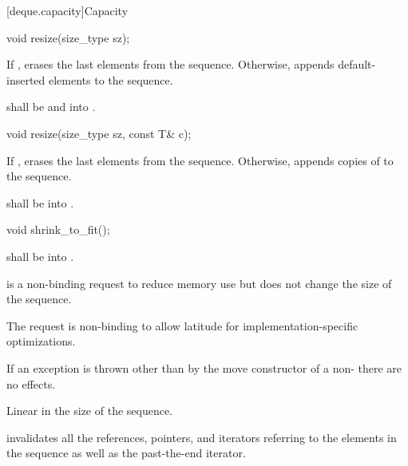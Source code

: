 [deque.capacity]{Capacity}

%
\begin{itemdecl}
void resize(size_type sz);
\end{itemdecl}

\begin{itemdescr}
\pnum
\effects If , erases the last  elements
from the sequence. Otherwise,
appends  default-inserted elements to the sequence.

\pnum
\requires {} shall be  and  into .
\end{itemdescr}

%
\begin{itemdecl}
void resize(size_type sz, const T& c);
\end{itemdecl}

\begin{itemdescr}
\pnum
\effects If , erases the last  elements
from the sequence. Otherwise,
appends  copies of  to the sequence.

\pnum
\requires {} shall be
 into .
\end{itemdescr}

%
\begin{itemdecl}
void shrink_to_fit();
\end{itemdecl}

\begin{itemdescr}
\pnum
\requires {} shall be  into .

\pnum
\effects {} is a non-binding request to reduce memory use
but does not change the size of the sequence.
\begin{note} The request is non-binding to allow latitude for
implementation-specific optimizations. \end{note}
If an exception is thrown other than by the move constructor
of a non-  there are no effects.

\pnum
\complexity Linear in the size of the sequence.

\pnum
\remarks {} invalidates all the references, pointers, and iterators
referring to the elements in the sequence as well as the past-the-end iterator.
\end{itemdescr}

